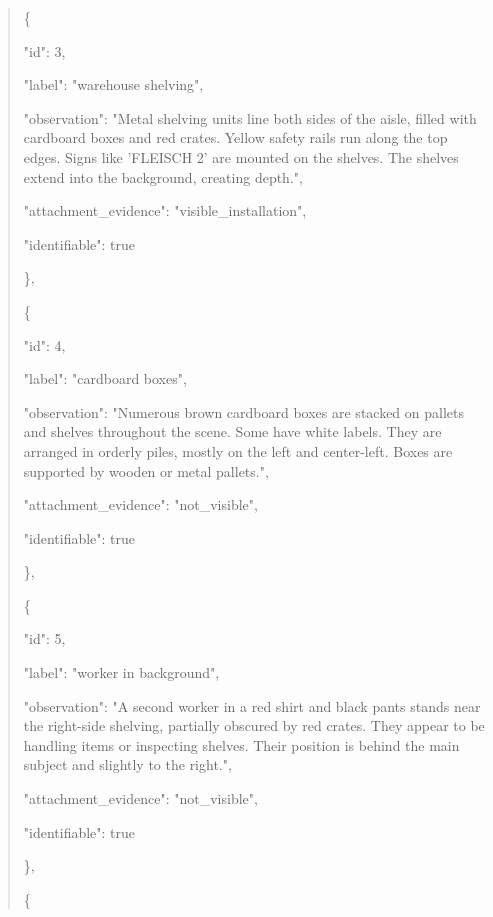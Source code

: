 \documentclass[10pt,a4paper]{article}
\begin{document}
\begin{quote}
    \{\par
      "id":\allowbreak{} 3,\allowbreak{}\par
      "label":\allowbreak{} "warehouse shelving",\allowbreak{}\par
      "observation":\allowbreak{} "Metal shelving units line both sides of the aisle,\allowbreak{} filled with cardboard boxes and red crates. Yellow safety rails run along the top edges. Signs like 'FLEISCH 2' are mounted on the shelves. The shelves extend into the background,\allowbreak{} creating depth.",\allowbreak{}\par
      "attachment\_evidence":\allowbreak{} "visible\_installation",\allowbreak{}\par
      "identifiable":\allowbreak{} true\par
    \},\allowbreak{}\par
    \{\par
      "id":\allowbreak{} 4,\allowbreak{}\par
      "label":\allowbreak{} "cardboard boxes",\allowbreak{}\par
      "observation":\allowbreak{} "Numerous brown cardboard boxes are stacked on pallets and shelves throughout the scene. Some have white labels. They are arranged in orderly piles,\allowbreak{} mostly on the left and center-left. Boxes are supported by wooden or metal pallets.",\allowbreak{}\par
      "attachment\_evidence":\allowbreak{} "not\_visible",\allowbreak{}\par
      "identifiable":\allowbreak{} true\par
    \},\allowbreak{}\par
    \{\par
      "id":\allowbreak{} 5,\allowbreak{}\par
      "label":\allowbreak{} "worker in background",\allowbreak{}\par
      "observation":\allowbreak{} "A second worker in a red shirt and black pants stands near the right-side shelving,\allowbreak{} partially obscured by red crates. They appear to be handling items or inspecting shelves. Their position is behind the main subject and slightly to the right.",\allowbreak{}\par
      "attachment\_evidence":\allowbreak{} "not\_visible",\allowbreak{}\par
      "identifiable":\allowbreak{} true\par
    \},\allowbreak{}\par
    \{\par

\end{quote}
\end{document}
